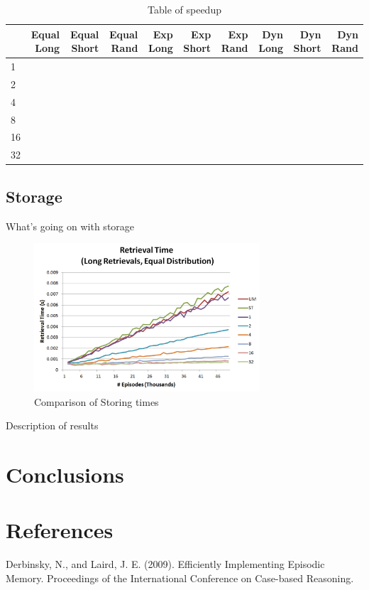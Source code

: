 \documentclass[11pt]{article} %
\begin{document}
\begin{table}[h]
\caption{Table of speedup}
\centering
    \begin{tabular}{|l|r|r|r|r|r|r|r|r|r|}
        \hline
        ~  & Equal Long & Equal Short & Equal Rand & Exp Long & Exp Short & Exp Rand & Dyn Long & Dyn Short & Dyn Rand \\ \hline
        1  & ~          & ~           & ~          & ~        & ~         & ~        & ~        & ~         & ~        \\  \hline
        2  & ~          & ~           & ~          & ~        & ~         & ~        & ~        & ~         & ~        \\ \hline
        4  & ~          & ~           & ~          & ~        & ~         & ~        & ~        & ~         & ~        \\ \hline
        8  & ~          & ~           & ~          & ~        & ~         & ~        & ~        & ~         & ~        \\ \hline
        16 & ~          & ~           & ~          & ~        & ~         & ~        & ~        & ~         & ~        \\ \hline
        32 & ~          & ~           & ~          & ~        & ~         & ~        & ~        & ~         & ~        \\
        \hline
    \end{tabular}
\end{table}

\subsection{Storage}

What's going on with storage

\begin{figure}[h]
\caption{Comparison of Storing times}
\centering
\includegraphics[width=0.75\textwidth]{images/ret_worst_eq}
\end{figure}

Description of results


\section{Conclusions}

\section{References}

Derbinsky, N., and Laird, J. E. (2009). Efficiently Implementing Episodic
Memory. Proceedings of the International Conference on Case-based Reasoning.
\end{document}
